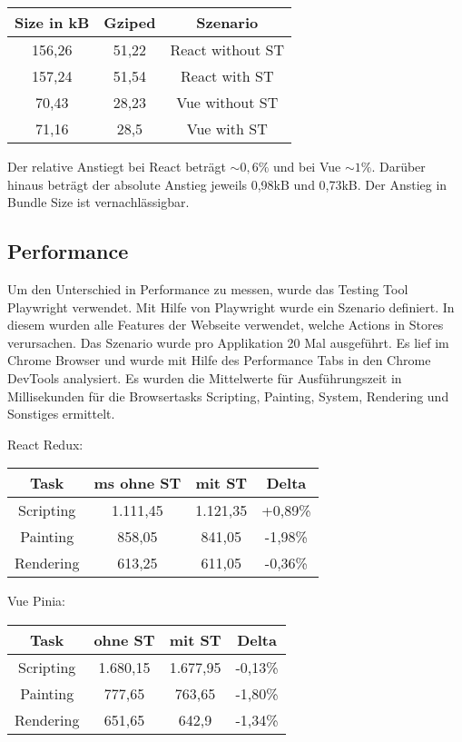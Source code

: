 \begin{center}
  \begin{tabular}{|c|c|c|} 
   \hline
   Size in kB & Gziped & Szenario \\ [0.5ex]
   \hline\hline
   156,26 & 51,22 & React without ST \\
   \hline
   157,24 & 51,54 & React with ST \\
   \hline
   70,43 & 28,23 & Vue without ST \\
   \hline
   71,16 & 28,5 & Vue with ST \\
   \hline
  \end{tabular}
\end{center}

Der relative Anstiegt bei React beträgt $\sim0,6\%$ und bei Vue $\sim1\%$. Darüber hinaus beträgt der absolute Anstieg jeweils 0,98kB und 0,73kB. Der Anstieg in Bundle Size ist vernachlässigbar.

\subsection{Performance}

Um den Unterschied in Performance zu messen, wurde das Testing Tool Playwright verwendet. Mit Hilfe von Playwright wurde ein Szenario definiert. In diesem wurden alle Features der Webseite verwendet, welche Actions in Stores verursachen. Das Szenario wurde pro Applikation 20 Mal ausgeführt. Es lief im Chrome Browser und wurde mit Hilfe des Performance Tabs in den Chrome DevTools analysiert. Es wurden die Mittelwerte für Ausführungszeit in Millisekunden für die Browsertasks Scripting, Painting, System, Rendering und Sonstiges ermittelt.

React Redux:

\begin{center}
  \begin{tabular}{|c|c|c|c|} 
   \hline
   Task & ms ohne ST & mit ST & Delta \\ [0.5ex]
   \hline\hline
   Scripting & 1.111,45 & 1.121,35 & +0,89\% \\
   \hline
   Painting & 858,05 & 841,05 & -1,98\% \\
   \hline
   Rendering & 613,25 & 611,05 & -0,36\% \\
   \hline
  \end{tabular}
\end{center}

Vue Pinia:

\begin{center}
  \begin{tabular}{|c|c|c|c|} 
   \hline
   Task & ohne ST & mit ST & Delta \\ [0.5ex]
   \hline\hline
   Scripting & 1.680,15 & 1.677,95 & -0,13\% \\
   \hline
   Painting & 777,65 & 763,65 & -1,80\% \\
   \hline
   Rendering & 651,65 & 642,9 & -1,34\% \\
   \hline
  \end{tabular}
\end{center}

